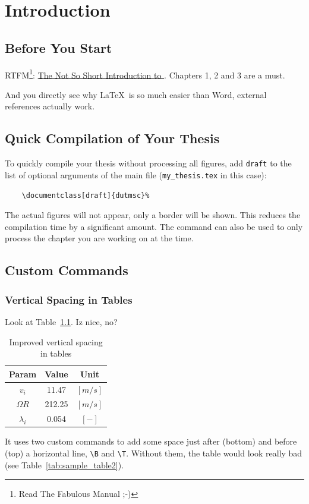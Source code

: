 \chapter{Introduction}
    \section{Before You Start}
        RTFM\footnote{Read The Fabulous Manual ;-)}: \href{http://www.ctan.org/tex-archive/info/lshort/english/lshort.pdf}{The Not So Short Introduction to \LaTeXe}.
        Chapters 1, 2 and 3 are a must.
        
        And you directly see why \LaTeX~is so much easier than Word, external references actually work.
    \section{Quick Compilation of Your Thesis}
        To quickly compile your thesis without processing all figures, add \verb+draft+ to the list of optional arguments of the main file (\verb+my_thesis.tex+ in this case):
        \begin{verbatim}
    \documentclass[draft]{dutmsc}%
        \end{verbatim}
        The actual figures will not appear, only a border will be shown. This reduces the compilation time by a significant amount. The command \verb++ can also be used to only process the chapter you are working on at the time.
    \section{Custom Commands}
        \subsection{Vertical Spacing in Tables}
            Look at Table~\ref{tab:sample_table}. Iz nice, no?
            \begin{table}[!htb]
                \centering
                \begin{tabular}{ c c c }
                    \hline
                    Param\T\B                   & Value   & Unit    \\
                    \hline
                    $v_i$\T                     & 11.47   & $[m/s]$ \\
                    $\Omega R$                  & 212.25  & $[m/s]$ \\
                    $\lambda_i$\B               & 0.054   & $[-]$   \\
                    \hline
                \end{tabular}
                \caption{Improved vertical spacing in tables}\label{tab:sample_table}
            \end{table}
            It uses two custom commands to add some space just after (bottom) and before (top) a horizontal line, \verb+\B+ and \verb+\T+. Without them, the table would look really bad (see Table~\ref{tab:sample_table2}).
            
